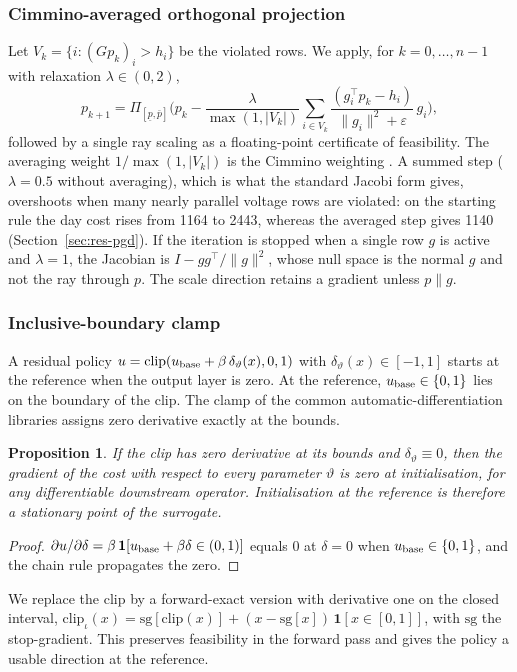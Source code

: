 \documentclass[11pt]{article}
\newtheorem{prop}{Proposition}
\begin{document}
\subsubsection{Cimmino-averaged orthogonal projection}
Let $V_k=\{i:(Gp_k)_i>h_i\}$ be the violated rows. We apply, for $k=0,\dots,n-1$ with relaxation $\lambda\in(0,2)$,
\begin{equation}
p_{k+1}=\Pi_{[\underline p,\bar p]}\Big(p_k-\frac{\lambda}{\max(1,|V_k|)}\sum_{i\in V_k}\frac{(g_i^\top p_k-h_i)}{\|g_i\|^2+\varepsilon}\,g_i\Big),
\end{equation}
followed by a single ray scaling as a floating-point certificate of feasibility. The averaging weight $1/\max(1,|V_k|)$ is the Cimmino weighting \cite{cimmino,censor}. A summed step ($\lambda=0.5$ without averaging), which is what the standard Jacobi form gives, overshoots when many nearly parallel voltage rows are violated: on the starting rule the day cost rises from 1164 to 2443, whereas the averaged step gives 1140 (Section~\ref{sec:res-pgd}). If the iteration is stopped when a single row $g$ is active and $\lambda=1$, the Jacobian is $I-gg^\top/\|g\|^2$, whose null space is the normal $g$ and not the ray through $p$. The scale direction retains a gradient unless $p\parallel g$.

\subsubsection{Inclusive-boundary clamp}
A residual policy $u=\mathrm{clip}(u_{\rm base}+\beta\,\delta_\vartheta(x),0,1)$ with $\delta_\vartheta(x)\in[-1,1]$ starts at the reference when the output layer is zero. At the reference, $u_{\rm base}\in\{0,1\}$ lies on the boundary of the clip. The clamp of the common automatic-differentiation libraries assigns zero derivative exactly at the bounds.
\begin{prop}\label{prop:clip}
If the clip has zero derivative at its bounds and $\delta_\vartheta\equiv0$, then the gradient of the cost with respect to every parameter $\vartheta$ is zero at initialisation, for any differentiable downstream operator. Initialisation at the reference is therefore a stationary point of the surrogate.
\end{prop}
\begin{proof}
$\partial u/\partial\delta=\beta\,\mathbf 1[u_{\rm base}+\beta\delta\in(0,1)]$ equals $0$ at $\delta=0$ when $u_{\rm base}\in\{0,1\}$, and the chain rule propagates the zero.
\end{proof}
We replace the clip by a forward-exact version with derivative one on the closed interval,
$\mathrm{clip}_\iota(x)=\mathrm{sg}[\mathrm{clip}(x)]+(x-\mathrm{sg}[x])\,\mathbf 1[x\in[0,1]]$, with $\mathrm{sg}$ the stop-gradient. This preserves feasibility in the forward pass and gives the policy a usable direction at the reference.
\end{document}
